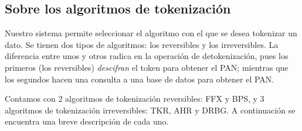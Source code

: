 \subsection{Sobre los algoritmos de tokenización}

Nuestro sistema permite seleccionar el algoritmo con el que se desea
tokenizar un dato. Se tienen dos tipos de algoritmos: los reversibles y
los irreversibles. La diferencia entre unos y otros radica en la
operación de detokenización, pues los primeros (los reversibles)
\textit{descifran} el token para obtener el PAN; mientras que los
segundos hacen una consulta a una base de datos para obtener el PAN.

Contamos con 2 algoritmos de tokenización reversibles: FFX y BPS, y 3
algoritmos de tokenización irreversibles: TKR, AHR y DRBG. A
continuación se encuentra una breve descripción de cada uno.
